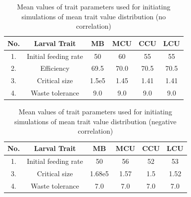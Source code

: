 \begin{table}[p]
  \centering
  \begin{tabular}{|c|c|c|c|c|c|}
    \hline
    \textbf{No.} & \textbf{Larval Trait} & \textbf{MB} & \textbf{MCU} & \textbf{CCU} & \textbf{LCU}\\
    \hline
    1. & Initial feeding rate & 50 & 60 & 55 & 55 \\
    \hline
    2. & Efficiency & 69.5 & 70.0 & 70.5 & 70.5 \\
    \hline
    3. & Critical size & 1.5e5 & 1.45 & 1.41 & 1.41 \\
    \hline
    4. & Waste tolerance & 9.0 & 9.0 & 9.0 & 9.0 \\
    \hline
  \end{tabular}
  \caption{Mean values of trait parameters used for initiating simulations of mean trait value distribution (no correlation)}
  \label{tab:dist_param}
\end{table}

\begin{table}[p]
  \centering
  \begin{tabular}{|c|c|c|c|c|c|}
    \hline
    \textbf{No.} & \textbf{Larval Trait} & \textbf{MB} & \textbf{MCU} & \textbf{CCU} & \textbf{LCU}\\
    \hline
    1. & Initial feeding rate & 50 & 56 & 52 & 53 \\
    \hline
    3. & Critical size & 1.68e5 & 1.57 & 1.5 & 1.52 \\
    \hline
    4. & Waste tolerance & 7.0 & 7.0 & 7.0 & 7.0 \\
    \hline
  \end{tabular}
  \caption{Mean values of trait parameters used for initiating simulations of mean trait value distribution (negative correlation)}
  \label{tab:neg_dist_param}
\end{table}

